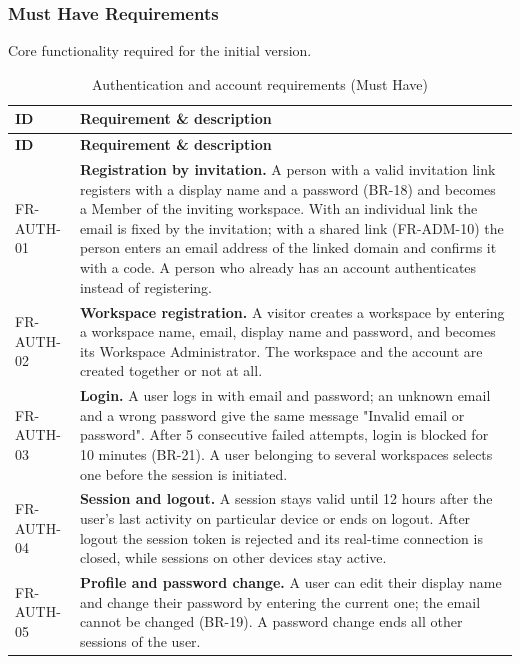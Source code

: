 \documentclass[
    english, %
]{VUMIFPSkursinis}
\newcommand{\frhead}{\textbf{ID} & \textbf{Requirement \& description} \\ \hline}
\begin{document}
\subsubsection{Must Have Requirements}
Core functionality required for the initial version.


\begin{longtable}{|p{}|p{}|}
\caption{Authentication and account requirements (Must Have)}\\ \hline
\frhead
\endfirsthead
\hline \frhead
\endhead
FR-AUTH-01 & \textbf{Registration by invitation.} A person with a valid invitation link registers with a display name and a password (BR-18) and becomes a Member of the inviting workspace. With an individual link the email is fixed by the invitation; with a shared link (FR-ADM-10) the person enters an email address of the linked domain and confirms it with a code. A person who already has an account authenticates instead of registering. \\ \hline
FR-AUTH-02 & \textbf{Workspace registration.} A visitor creates a workspace by entering a workspace name, email, display name and password, and becomes its Workspace Administrator. The workspace and the account are created together or not at all. \\ \hline
FR-AUTH-03 & \textbf{Login.} A user logs in with email and password; an unknown email and a wrong password give the same message "Invalid email or password". After 5 consecutive failed attempts, login is blocked for 10 minutes (BR-21). A user belonging to several workspaces selects one before the session is initiated. \\ \hline
FR-AUTH-04 & \textbf{Session and logout.} A session stays valid until 12 hours after the user's last activity on particular device or ends on logout. After logout the session token is rejected and its real-time connection is closed, while sessions on other devices stay active. \\ \hline
FR-AUTH-05 & \textbf{Profile and password change.} A user can edit their display name and change their password by entering the current one; the email cannot be changed (BR-19). A password change ends all other sessions of the user. \\ \hline
\end{longtable}


\end{document}
